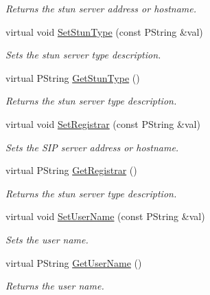\begin{CompactItemize}
\begin{CompactList}\small\item\em Returns the stun server address or hostname. \item\end{CompactList}\item 
virtual void \hyperlink{classModel_d2fd66a01c2cea8bc295567da8998733}{SetStunType} (const PString \&val)
\begin{CompactList}\small\item\em Sets the stun server type description. \item\end{CompactList}\item 
virtual PString \hyperlink{classModel_6c040c5501c12f31f260280ea872b0b4}{GetStunType} ()
\begin{CompactList}\small\item\em Returns the stun server type description. \item\end{CompactList}\item 
virtual void \hyperlink{classModel_437d34289432b9687d0bc2f65d89aa4f}{SetRegistrar} (const PString \&val)
\begin{CompactList}\small\item\em Sets the SIP server address or hostname. \item\end{CompactList}\item 
virtual PString \hyperlink{classModel_5d7dd928f54ce00e04f1763728b9b85a}{GetRegistrar} ()
\begin{CompactList}\small\item\em Returns the stun server type description. \item\end{CompactList}\item 
virtual void \hyperlink{classModel_de7353a1170fbb7f587c069270be7f7a}{SetUserName} (const PString \&val)
\begin{CompactList}\small\item\em Sets the user name. \item\end{CompactList}\item 
virtual PString \hyperlink{classModel_18c1848740876abd9544c870c6665879}{GetUserName} ()
\begin{CompactList}\small\item\em Returns the user name. \item\end{CompactList}\item 

\end{CompactItemize}
